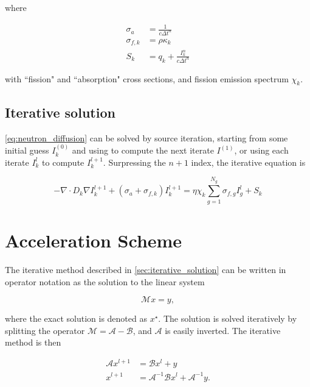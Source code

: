 \documentclass{template}
\begin{document}
where

\begin{subequations}
  \begin{align}
  \sigma_a     &= \frac{1}{c\Delta t^n}\\
  \sigma_{f, k} &= \rho \kappa_k\\
  S_k &= q_k + \frac{I_k^n}{c\Delta t^n}
\end{align}
\end{subequations}

with ``fission" and ``absorption" cross sections, and fission emission spectrum $\chi_k$. 

\subsection{Iterative solution}\label{sec:iterative_solution}

\autoref{eq:neutron_diffusion} can be solved by source iteration, starting from some initial guess $I_{k}^{(0)}$ and using to compute the next iterate $I^{(1)}$, or using each iterate $I_{k}^{l}$ to compute $I_{k}^{l+1}$. Surpressing the $n+1$ index, the iterative equation is

\begin{equation}
  -\nabla \cdot D_k \nabla I_k^{l+1} + \left( \sigma_a + \sigma_{f, k} \right)I_k^{l+1} = \eta \chi_k \sum_{g=1}^{N_g}\sigma_{f, g}I_g^l + S_k
\end{equation}

\section{Acceleration Scheme}

The iterative method described in \autoref{sec:iterative_solution} can be written in operator notation as the solution to the linear system

\begin{equation}
  \mathcal{M}x = y,
\end{equation}

where the exact solution is denoted as $x^\star$. The solution is solved iteratively by splitting the operator $\mathcal{M} = \mathcal{A} - \mathcal{B}$, and $\mathcal{A}$ is easily inverted. The iterative method is then

\begin{align}
  \mathcal{A}x^{l+1} &= \mathcal{B}x^l + y\\
  x^{l+1} &=  \mathcal{A}^{-1} \mathcal{B}x^l + \mathcal{A}^{-1}y.
\end{align}
\end{document}

